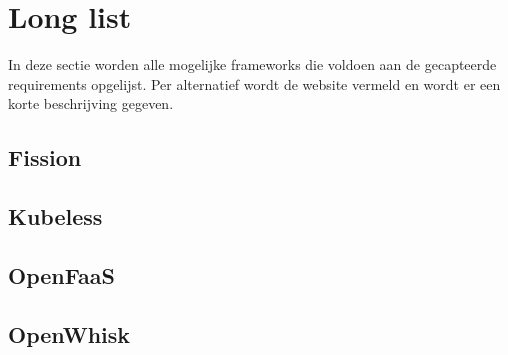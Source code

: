 \section{Long list}
In deze sectie worden alle mogelijke frameworks die voldoen aan de gecapteerde requirements opgelijst. Per alternatief wordt de website vermeld en wordt er een korte beschrijving gegeven.
\subsection{Fission}
\subsection{Kubeless}
\subsection{OpenFaaS}
\subsection{OpenWhisk}